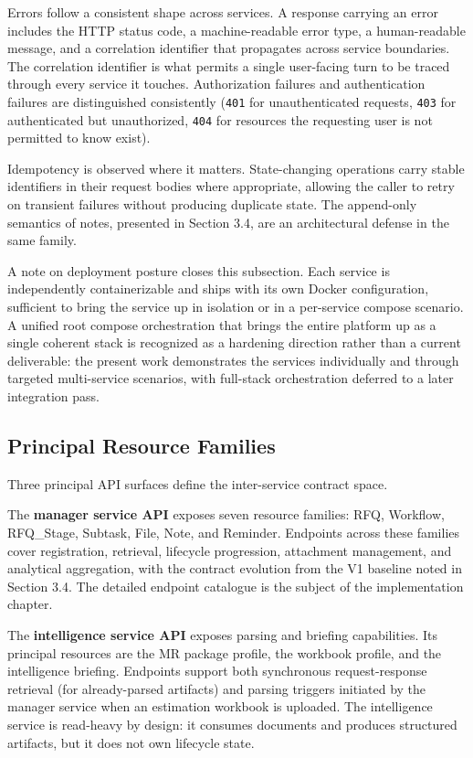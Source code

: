 Errors follow a consistent shape across services. A response carrying an error includes the HTTP status code, a machine-readable error type, a human-readable message, and a correlation identifier that propagates across service boundaries. The correlation identifier is what permits a single user-facing turn to be traced through every service it touches. Authorization failures and authentication failures are distinguished consistently (\texttt{401} for unauthenticated requests, \texttt{403} for authenticated but unauthorized, \texttt{404} for resources the requesting user is not permitted to know exist).

Idempotency is observed where it matters. State-changing operations carry stable identifiers in their request bodies where appropriate, allowing the caller to retry on transient failures without producing duplicate state. The append-only semantics of notes, presented in Section 3.4, are an architectural defense in the same family.

A note on deployment posture closes this subsection. Each service is independently containerizable and ships with its own Docker configuration, sufficient to bring the service up in isolation or in a per-service compose scenario. A unified root compose orchestration that brings the entire platform up as a single coherent stack is recognized as a hardening direction rather than a current deliverable: the present work demonstrates the services individually and through targeted multi-service scenarios, with full-stack orchestration deferred to a later integration pass.

\subsection*{Principal Resource Families}
Three principal API surfaces define the inter-service contract space.

The \textbf{manager service API} exposes seven resource families: RFQ, Workflow, RFQ\_Stage, Subtask, File, Note, and Reminder. Endpoints across these families cover registration, retrieval, lifecycle progression, attachment management, and analytical aggregation, with the contract evolution from the V1 baseline noted in Section 3.4. The detailed endpoint catalogue is the subject of the implementation chapter.

The \textbf{intelligence service API} exposes parsing and briefing capabilities. Its principal resources are the MR package profile, the workbook profile, and the intelligence briefing. Endpoints support both synchronous request-response retrieval (for already-parsed artifacts) and parsing triggers initiated by the manager service when an estimation workbook is uploaded. The intelligence service is read-heavy by design: it consumes documents and produces structured artifacts, but it does not own lifecycle state.

